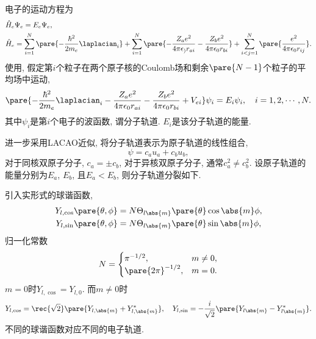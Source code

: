 \documentclass[hidelinks]{ctexart}
\begin{document}
电子的运动方程为
\begin{align*}
    & \hat H_e \Psi_e = E_e \Psi_e, \\
    & \hat H_e = \sum_{i=1}^N \pare{-\frac{\hbar^2}{2m_e}\laplacian_i} + \sum_{i=1}^N \pare{-\frac{Z_a e^2}{4\pi\epsilon_) r_{ai}} - \frac{Z_b e^2}{4\pi\epsilon_0 r_{bi}}} + \sum_{i<j = 1}^N \pare{\frac{e^2}{4\pi\epsilon_0 r_{ij}}}.
\end{align*}
使用, 假定第$i$个粒子在两个原子核的Coulomb场和剩余$\pare{N-1}$个粒子的平均场中运动,
\[ \pare{-\frac{\hbar^2}{2m_e}\laplacian_i - \frac{Z_a e^2}{4\pi\epsilon_0 r_{ai}} - \frac{Z_b e^2}{4\pi\epsilon_0 r_{bi}} + V_{ei}}\psi_i = E_i \psi_i,\quad i = 1,2,\cdots, N. \]
其中$\psi_i$是第$i$个电子的波函数, 谓分子轨道. $E_i$是该分子轨道的能量.
\par
进一步采用LACAO近似, 将分子轨道表示为原子轨道的线性组合,
\[ \psi = c_a u_a + c_b u_b, \]
对于同核双原子分子, $c_a = \pm c_b$, 对于异核双原子分子, 通常$c_a^2 \neq c_b^2$. 设原子轨道的能量分别为$E_a$, $E_b$, 且$E_a<E_b$, 则分子轨道分裂如下.
\begin{center}
\end{center}
\par
引入实形式的球谐函数,
\begin{align*}
    Y_{l,\cos}\pare{\theta,\phi} &= N\Theta_{l\abs{m}}\pare{\theta}\cos\abs{m}\phi, \\
    Y_{l,\sin}\pare{\theta,\phi} &= N\Theta_{l\abs{m}}\pare{\theta}\sin\abs{m}\phi,
\end{align*}
归一化常数
\[ N = \begin{cases}
    \pi^{-1/2}, & m\neq 0, \\
    \pare{2\pi}^{-1/2}, & m = 0.
\end{cases} \]
$m=0$时$Y_{l,\cos} = Y_{l,0}$. 而$m\neq 0$时
\[ Y_{l,\cos} = \rec{\sqrt{2}}\pare{Y_{l,\abs{m}} + Y^*_{l,\abs{m}}},\quad Y_{l,\sin} = -\frac{i}{\sqrt{2}}\pare{Y_{l\abs{m}} - Y^*_{l\abs{m}}}. \]
不同的球谐函数对应不同的电子轨道.
\par
\end{document}
